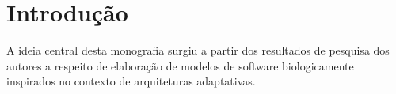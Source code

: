 





\chapter{Introdução}
\label{cap:intro} %


A ideia central desta monografia surgiu a partir dos resultados de pesquisa dos autores a respeito de elaboração de modelos de software biologicamente inspirados no contexto de arquiteturas adaptativas.

